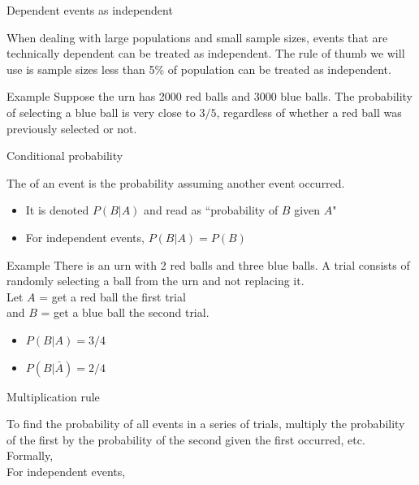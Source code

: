 \documentclass[xcolor=table, aspectratio=169, bigger, handout]{beamer}
\begin{document}
\begin{frame}{Dependent events as independent}
\begin{block}{}
When dealing with large populations and small sample sizes, events that are technically dependent can be treated as independent. The rule of thumb we will use is sample sizes less than 5\% of population can be treated as independent.
\end{block}

\pause
\begin{exampleblock}{Example}
Suppose the urn has 2000 red balls and 3000 blue balls. The probability of selecting a blue ball is very close to $3/5$, regardless of whether a red ball was previously selected or not.
\end{exampleblock}
\end{frame}

\begin{frame}{Conditional probability}
\begin{block}{}
The  of an event is the probability assuming another event occurred. 
\begin{itemize}
\pause
\item It is denoted $P(B|A)$ and read as ``probability of $B$ given $A$"
\pause
\item For independent events, $P(B|A) = P(B)$
\end{itemize}
\end{block}

\pause
\begin{exampleblock}{Example}
There is an urn with 2 red balls and three blue balls. A trial consists of randomly selecting a ball from the urn and not replacing it.\\
\medskip Let $A$ = get a red ball the first trial\\
 and $B$ = get a blue ball the second trial.
\begin{itemize}
\pause
\item $P(B | A) = 3 / 4$
\pause
\item $P(B | \bar A) =  2 / 4$
\end{itemize}

\end{exampleblock}
\end{frame}

\begin{frame}{Multiplication rule}
\begin{block}{}
To find the probability of all events in a series of trials, multiply the probability of the first by the probability of the second given the first occurred, etc.\\
\medskip
\pause
Formally,\\ \smallskip
{}
\pause\medskip
For independent events,\\ \smallskip
{}
\end{block}
\end{frame}
\end{document}

